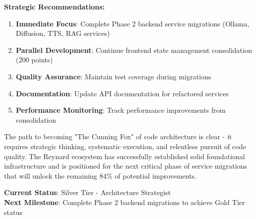 \documentclass[10pt]{article}
\begin{document}
\textbf{Strategic Recommendations:}
\begin{enumerate}
    \item \textbf{Immediate Focus}: Complete Phase 2 backend service migrations (Ollama, Diffusion, TTS, RAG services)
    \item \textbf{Parallel Development}: Continue frontend state management consolidation (200 points)
    \item \textbf{Quality Assurance}: Maintain test coverage during migrations
    \item \textbf{Documentation}: Update API documentation for refactored services
    \item \textbf{Performance Monitoring}: Track performance improvements from consolidation
\end{enumerate}

The path to becoming "The Cunning Fox" of code architecture is clear - it requires strategic thinking, systematic execution, and relentless pursuit of code quality. The Reynard ecosystem has successfully established solid foundational infrastructure and is positioned for the next critical phase of service migrations that will unlock the remaining 84\% of potential improvements.

\textbf{Current Status}: Silver Tier - Architecture Strategist \\
\textbf{Next Milestone}: Complete Phase 2 backend migrations to achieve Gold Tier status
\end{document}
